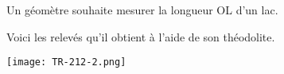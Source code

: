 
Un géomètre souhaite mesurer la longueur OL d'un lac.

Voici les relevés qu'il obtient à l'aide de son théodolite.

\texttt{[image: TR-212-2.png]} 
